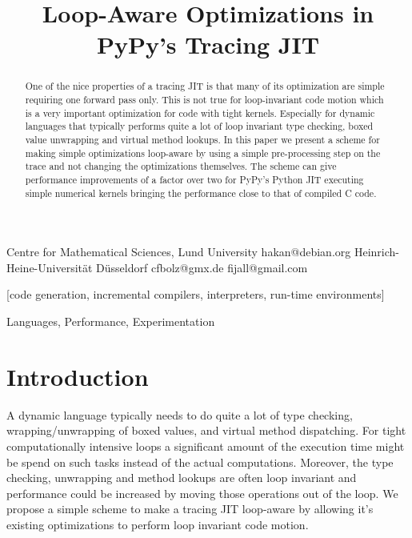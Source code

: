 \documentclass[preprint]{sigplanconf}
\begin{document}
\copyrightdata{[to be supplied]} 


\title{Loop-Aware Optimizations in PyPy's Tracing JIT}

           {Centre for Mathematical Sciences, Lund University}
           {hakan@debian.org}
           {Heinrich-Heine-Universität Düsseldorf}
           {cfbolz@gmx.de}
           {}
           {fijall@gmail.com}

\maketitle

\begin{abstract}
One of the nice properties of a tracing JIT is that many of its optimization
are simple requiring one forward pass only. This is not true for loop-invariant code
motion which is a very important optimization for code with tight kernels.
Especially for dynamic languages that typically performs quite a lot of loop invariant
type checking, boxed value unwrapping and virtual method lookups.
In this paper we present a scheme for making simple optimizations loop-aware by
using a simple pre-processing step on the trace and not changing the
optimizations themselves. The scheme can give performance improvements of a
factor over two for PyPy's Python JIT executing simple numerical kernels
bringing the performance close to that of compiled C code.
\end{abstract}

[code generation,
incremental compilers, interpreters, run-time environments]

\terms
Languages, Performance, Experimentation


\section{Introduction}

A dynamic language typically needs to do quite a lot of type
checking, wrapping/unwrapping of boxed values, and virtual method dispatching. 
For tight computationally intensive loops a
significant amount of the execution time might be spend on such tasks
instead of the actual computations. Moreover, the type checking,
unwrapping and method lookups are often loop invariant and performance could be increased
by moving those operations out of the loop. We propose a simple scheme
to make a tracing JIT loop-aware by allowing it's existing optimizations to
perform loop invariant code motion. 
\end{document}
